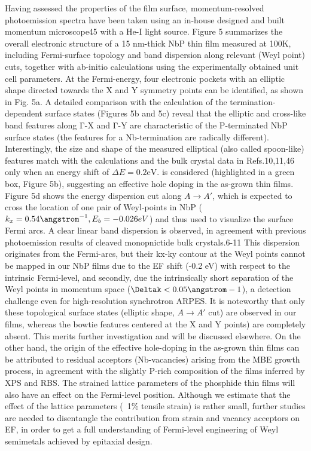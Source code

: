 Having assessed the properties of the film surface, momentum-resolved 
photoemission spectra have been taken using an in-house designed and built 
momentum microscope45 with a He-I light source. Figure 5 summarizes the
overall electronic structure of a 15 nm-thick NbP thin film measured at 
100K, including Fermi-surface topology and band dispersion along relevant 
(Weyl point) cuts, together with ab-initio calculations using the experimentally 
obtained unit cell parameters. At the Fermi-energy, four electronic pockets with 
an elliptic shape directed towards the X and Y symmetry points can be identified, 
as shown in Fig. 5a.  A detailed comparison with the calculation of the 
termination-dependent surface states (Figures 5b and 5c) reveal that the elliptic 
and cross-like band features along Γ-X and Γ-Y are characteristic of the P-terminated 
NbP surface states (the features for a Nb-termination are radically different). 
Interestingly, the size and shape of the measured elliptical (also called spoon-like) 
features match with the calculations and the bulk crystal data in Refs.10,11,46 only 
when an energy shift of $\Delta E = 0.2 \text{eV}$. is considered (highlighted 
in a green box, Figure 5b), suggesting an effective hole doping in the as-grown 
thin films.  Figure 5d shows the energy dispersion cut along $A \rightarrow A'$, 
which is expected to cross the location of one pair of Weyl-points in NbP 
($k_x=0.54 \angstrom^{-1}, E_b = -0.026 eV$) and thus used to visualize the surface 
Fermi arcs. A clear linear band dispersion is observed, in agreement with previous 
photoemission results of cleaved monopnictide bulk crystals.6-11  This dispersion 
originates from the Fermi-arcs, but their kx-ky contour at the Weyl points cannot 
be mapped in our NbP films due to the EF shift (-0.2 eV) with respect to the intrinsic 
Fermi-level, and secondly, due the intrinsically short separation of the Weyl points 
in momentum space ($\Deltak < 0.05 \angstrom-1$), a detection challenge even for high-resolution 
synchrotron ARPES. It is noteworthy that only these topological surface states (elliptic 
shape, $A \rightarrow A'$ cut) are observed in our films, whereas the bowtie features
centered at the X and Y points) are completely absent.  This merits further investigation
and will be discussed elsewhere. On the other hand, the origin of the effective hole-doping 
in the as-grown thin films can be attributed to residual acceptors (Nb-vacancies) arising 
from the MBE growth process, in agreement with the slightly P-rich composition of the films 
inferred by XPS and RBS.  The strained lattice parameters of the phosphide thin films 
will also have an effect on the Fermi-level position. Although we estimate that the effect 
of the lattice parameters (~1\% tensile strain) is rather small, further studies are needed 
to disentangle the contribution from strain and vacancy acceptors on EF, in order to get a 
full understanding of Fermi-level engineering of Weyl semimetals achieved by epitaxial design.
